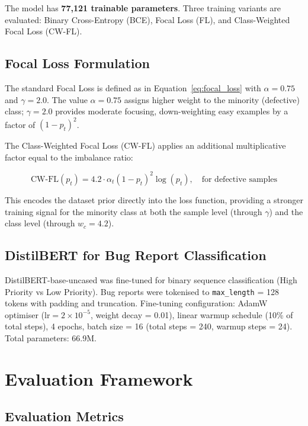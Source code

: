 \documentclass[12pt,a4paper,oneside]{report}
\begin{document}
The model has \textbf{77,121 trainable parameters}. Three training variants are evaluated: Binary Cross-Entropy (BCE), Focal Loss (FL), and Class-Weighted Focal Loss (CW-FL).

\subsection{Focal Loss Formulation}

The standard Focal Loss is defined as in Equation~\ref{eq:focal_loss} with $\alpha = 0.75$ and $\gamma = 2.0$. The value $\alpha = 0.75$ assigns higher weight to the minority (defective) class; $\gamma = 2.0$ provides moderate focusing, down-weighting easy examples by a factor of $(1 - p_t)^2$.

The Class-Weighted Focal Loss (CW-FL) applies an additional multiplicative factor equal to the imbalance ratio:

\begin{equation}
  \text{CW-FL}(p_t) = 4.2 \cdot \alpha_t (1 - p_t)^{2} \log(p_t), \quad \text{for defective samples}
\end{equation}

This encodes the dataset prior directly into the loss function, providing a stronger training signal for the minority class at both the sample level (through $\gamma$) and the class level (through $w_c = 4.2$).

\subsection{DistilBERT for Bug Report Classification}

DistilBERT-base-uncased \citep{sanh2019} was fine-tuned for binary sequence classification (High Priority vs Low Priority). Bug reports were tokenised to \texttt{max\_length} = 128 tokens with padding and truncation. Fine-tuning configuration: AdamW optimiser ($\text{lr} = 2 \times 10^{-5}$, weight decay = 0.01), linear warmup schedule (10\% of total steps), 4 epochs, batch size = 16 (total steps = 240, warmup steps = 24). Total parameters: 66.9M.

\section{Evaluation Framework}

\subsection{Evaluation Metrics}
\end{document}
